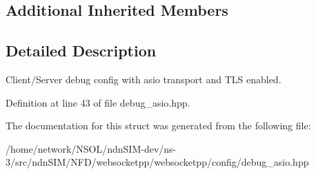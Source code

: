 \subsection*{Additional Inherited Members}


\subsection{Detailed Description}
Client/\+Server debug config with asio transport and T\+LS enabled. 

Definition at line 43 of file debug\+\_\+asio.\+hpp.



The documentation for this struct was generated from the following file\+:\begin{DoxyCompactItemize}
\item 
/home/network/\+N\+S\+O\+L/ndn\+S\+I\+M-\/dev/ns-\/3/src/ndn\+S\+I\+M/\+N\+F\+D/websocketpp/websocketpp/config/debug\+\_\+asio.\+hpp\end{DoxyCompactItemize}
